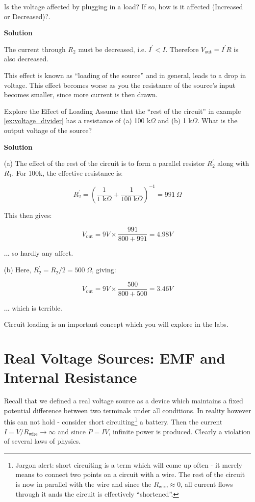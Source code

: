 \documentclass{tufte-book}
\newcommand\Solution{\par\textbf{\textsf{Solution}}\par\medskip}
\begin{document}
\begin{myexample}[label = ex:popquiz_loading]{Is the voltage affected by plugging in a load?}
\noindent If so, how is it affected (Increased or Decreased)?.
\Solution
The current through $R_2$ must be decreased, i.e. $I^\prime< I$. Therefore $V_\text{out} = I^\prime R$ is also decreased.
\end{myexample}


This effect is known as ``loading of the source'' and in general, leads to a drop in voltage. This effect becomes worse as you the resistance of the source's input becomes smaller, since more current is then drawn.

\begin{myexample}[label = ex:circ_load2]{Explore the Effect of Loading}
Assume that the ``rest of the circuit'' in example \ref{ex:voltage_divider} has a resistance of (a) 100 k$\Omega$ and (b) 1 k$\Omega$. What is the output voltage of the source?
\Solution
\noindent(a) The effect of the rest of the circuit is to form a parallel resistor $R^\prime_2$ along with $R_1$. For 100k, the effective resistance is:


$$
R_2^\prime = \left(\frac{1}{1\text{ k}\Omega} + \frac{1}{100\text{ k}\Omega}\right)^{-1} = 991~\Omega
$$

This then gives:

$$
V_\text{out} = 9V\times\frac{991}{800+991} = 4.98V
$$

\noindent... so hardly any affect.

\noindent(b) Here, $R^\prime_2 = R_2/2 = 500~\Omega$, giving:

$$
V_\text{out} = 9V\times\frac{500}{800+500} = 3.46V
$$

\noindent... which is terrible.
\end{myexample}

Circuit loading is an important concept which you will explore in the labs.

\section{Real Voltage Sources: EMF and Internal Resistance}
Recall that we defined a real voltage source as a device which maintains a fixed potential difference between two terminals under all conditions. In reality however this can not hold - consider short circuiting\footnote{Jargon alert: short circuiting is a term which will come up often - it merely means to connect two points on a circuit with a wire. The rest of the circuit is now in parallel with the wire and since the $R_\text{wire}\approx0$, all current flows through it ands the circuit is effectively ``shortened''. } a battery. Then the current $I=V/R_\text{wire} \rightarrow \infty$ and since $P=IV$, infinite power is produced. Clearly a violation of several laws of physics. 
\end{document}
